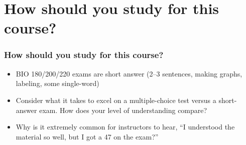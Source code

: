 \section{How should you study for this course?}

\begin{noheadline}
\begin{frame}
    \frametitle{How should you study for this course?}
    \begin{itemize}%
        \item BIO 180/200/220 exams are short answer (2--3 sentences, making
            graphs, labeling, some single-word)
        \item Consider what it takes to excel on a multiple-choice test versus
            a short-answer exam. How does your level of understanding compare?
        \item Why is it extremely common for instructors to hear, ``I
            understood the material so well, but I got a 47 on the exam?''
    \end{itemize}

\end{frame}
\end{noheadline}

